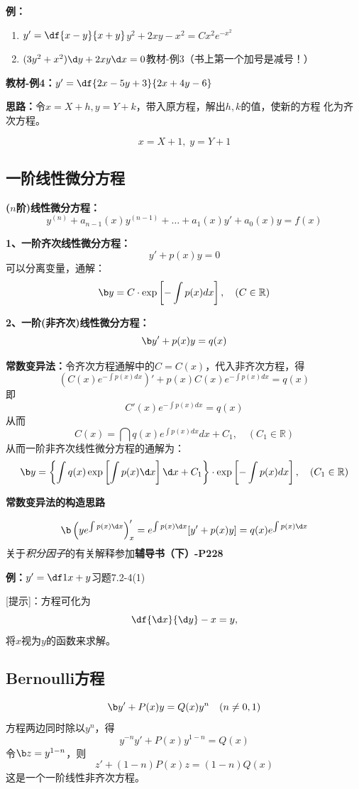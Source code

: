 {\bf 例：}
\begin{enumerate}[(1)]
  \setlength{\itemindent}{1cm}
  \item $y'=\df{x-y}{x+y}$\hfill $y^2+2xy-x^2=Cx^2e^{-x^2}$
  \item $(3y^2+x^2)\d y+2xy\d x=0$\hfill 教材-例3（书上第一个加号是减号！）
\end{enumerate}

{\bf 教材-例4：}$y'=\df{2x-5y+3}{2x+4y-6}$

{\bf 思路：}令$x=X+h,y=Y+k$，带入原方程，解出$h,k$的值，使新的方程
化为齐次方程。

$$x=X+1,\;y=Y+1$$

\subsection{一阶线性微分方程}

{\bf ($n$阶)线性微分方程：}
$$y^{(n)}+a_{n-1}(x)y^{(n-1)}+\ldots+a_1(x)y'+a_0(x)y=f(x)$$

{\bf 1、一阶齐次线性微分方程：}
$$y'+p(x)y=0$$
可以分离变量，通解：
$${\b y=C\cdot\exp\left[-\int p(x)dx\right],\quad(C\in\mathbb{R})}$$

{\bf 2、一阶(非齐次)线性微分方程：}
$${\b y'+p(x)y=q(x)}$$

{\bf 常数变异法：}令齐次方程通解中的$C=C(x)$，代入非齐次方程，得
$$\left(C(x)e^{-\int p(x)dx}\right)'+p(x)C(x)e^{-\int
 p(x)dx}=q(x)$$
即
$$C'(x)e^{-\int p(x)dx}=q(x)$$
从而
$$C(x)=\dint q(x)e^{\int p(x)dx}dx+C_1,\quad(C_1\in\mathbb{R})$$ 
从而一阶非齐次线性微分方程的通解为：
$${\b y=\left\{\int q(x)\exp\left[\int p(x)\d x\right]\d x+C_1\right\}
\cdot\exp\left[-\int p(x)dx\right],\quad(C_1\in\mathbb{R})}$$

\begin{shaded}
{\bf 常数变异法的构造思路}

$${\b\left(ye^{\int p(x)\d x}\right)'_x=e^{\int p(x)\d x}[y'+p(x)y]
=q(x)e^{\int p(x)\d x}}$$
关于{\it 积分因子}的有关解释参加{\bf 辅导书（下）-P228}
\end{shaded}

{\bf 例：}$y'=\df1{x+y}$\hfill 习题7.2-4(1)

[提示]：方程可化为
$$\df{\d x}{\d y}-x=y,$$
将$x$视为$y$的函数来求解。

\subsection{Bernoulli方程}

$${\b y'+P(x)y=Q(x)y^n\quad(n\ne 0,1)}$$ 
方程两边同时除以$y^n$，得
$$y^{-n}y'+P(x)y^{1-n}=Q(x)$$ 
令${\b z=y^{1-n}}$，则
$$z'+(1-n)P(x)z=(1-n)Q(x)$$
这是一个一阶线性非齐次方程。

